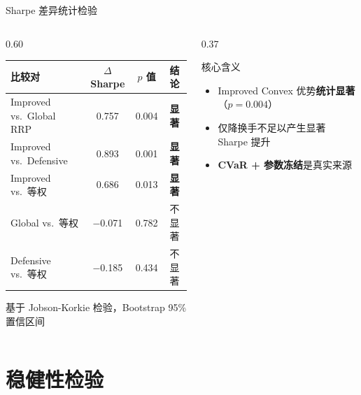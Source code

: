 \documentclass[aspectratio=169,11pt]{beamer}
\newcommand{\improvedVsGlobalDiff}{0.757}
\newcommand{\improvedVsGlobalPValue}{0.004}
\begin{document}
\begin{frame}{Sharpe 差异统计检验}
  \begin{columns}[T]
    \begin{column}{0.60\textwidth}
      \footnotesize\renewcommand{\arraystretch}{1.35}
      \begin{tabular}{@{}lccc@{}}
        \toprule
        比较对 & $\Delta$Sharpe & $p$ 值 & 结论 \\
        \midrule
        Improved vs.\ Global RRP & \improvedVsGlobalDiff & \improvedVsGlobalPValue & \textbf{显著} \\
        Improved vs.\ Defensive  & 0.893 & 0.001 & \textbf{显著} \\
        Improved vs.\ 等权       & 0.686 & 0.013 & \textbf{显著} \\
        Global vs.\ 等权         & $-$0.071 & 0.782 & 不显著 \\
        Defensive vs.\ 等权      & $-$0.185 & 0.434 & 不显著 \\
        \bottomrule
      \end{tabular}
      \vspace{0.3em}
      \scriptsize 基于 Jobson-Korkie 检验，Bootstrap 95\% 置信区间
    \end{column}
    \begin{column}{0.37\textwidth}
      \begin{block}{核心含义}
        \footnotesize
        \begin{itemize}
          \item Improved Convex 优势\textbf{统计显著}（$p=\improvedVsGlobalPValue$）
          \item 仅降换手不足以产生显著 Sharpe 提升
          \item \textbf{CVaR + 参数冻结}是真实来源
        \end{itemize}
      \end{block}
    \end{column}
  \end{columns}
\end{frame}

\section{稳健性检验}
\end{document}
